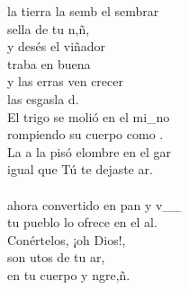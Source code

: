 \begin{cancion}[El sembrador][]%
	 la tierra la semb el sembrar \\
	 sella de tu n,ñ,  \\
	y desés el viñador \\
	traba en buena  \\
	y las erras ven crecer \\
	las esgasla d.\\
	El trigo se molió en el mi_no\\
	rompiendo su cuerpo como .\\
	La a la pisó elombre en el gar\\
	igual que Tú te dejaste ar.\\
\jump\\
	ahora convertido en pan y v__\\
	tu pueblo lo ofrece en el al.\\
	Conértelos, ¡oh Dios!,\\
	son utos de tu ar,\\
	en tu cuerpo y ngre,ñ. \\
\end{cancion}%
